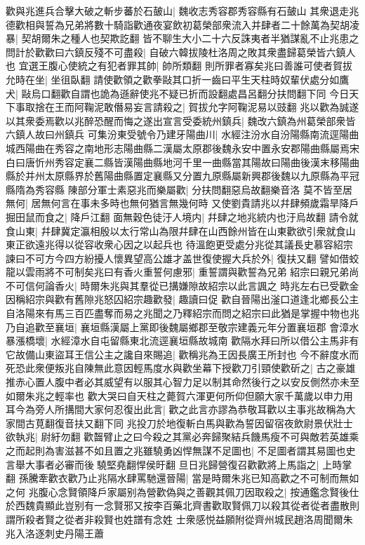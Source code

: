 歡與兆進兵合擊大破之斬步蕃於石皷山|{
	魏收志秀容郡秀容縣有石皷山}
其衆退走兆德歡相與誓為兄弟將數十騎詣歡通夜宴飲初葛榮部衆流入并肆者二十餘萬為契胡凌暴|{
	契胡爾朱之種人也契欺訖翻}
皆不聊生大小二十六反誅夷者半猶謀亂不止兆患之問計於歡歡曰六鎮反殘不可盡殺|{
	自破六韓拔陵杜洛周之敗其衆盡歸葛榮皆六鎮人也}
宜選王腹心使統之有犯者罪其帥|{
	帥所類翻}
則所罪者寡矣兆曰善誰可使者賀拔允時在坐|{
	坐徂臥翻}
請使歡領之歡拳敺其口折一齒曰平生天柱時奴輩伏處分如鷹犬|{
	敺烏口翻歡自謂也詭為遜辭使兆不疑已折而設翻處昌呂翻分扶問翻下同}
今日天下事取捨在王而阿鞠泥敢僭易妄言請殺之|{
	賀拔允字阿鞠泥易以豉翻}
兆以歡為誠遂以其衆委焉歡以兆醉恐醒而悔之遂出宣言受委統州鎮兵|{
	魏改六鎮為州葛榮部衆皆六鎮人故曰州鎮兵}
可集汾東受號令乃建牙陽曲川|{
	水經注汾水自汾陽縣南流逕陽曲城西陽曲在秀容之南地形志陽曲縣二漢屬太原郡後魏永安中置永安郡陽曲縣屬焉宋白曰唐忻州秀容定襄二縣皆漢陽曲縣地河千里一曲縣當其陽故曰陽曲後漢末移陽曲縣於并州太原縣界於舊陽曲縣置定襄縣又分置九原縣屬新興郡後魏以九原縣為平冠縣隋為秀容縣}
陳部分軍士素惡兆而樂屬歡|{
	分扶問翻惡烏故翻樂音洛}
莫不皆至居無何|{
	居無何言在事未多時也無何猶言無幾何時}
又使劉貴請兆以幷肆頻歲霜旱降戶掘田鼠而食之|{
	降戶江翻}
面無穀色徒汙人境内|{
	幷肆之地兆統内也汙烏故翻}
請令就食山東|{
	幷肆冀定瀛相殷以太行常山為限幷肆在山西餘州皆在山東歡欲引衆就食山東正欲遠兆得以從容收衆心因之以起兵也}
待溫飽更受處分兆從其議長史慕容紹宗諫曰不可方今四方紛擾人懷異望高公雄才盖世復使握大兵於外|{
	復扶又翻}
譬如借蛟龍以雲雨將不可制矣兆曰有香火重誓何慮邪|{
	重誓謂與歡誓為兄弟}
紹宗曰親兄弟尚不可信何論香火|{
	時爾朱兆與其羣從已搆嫌隙故紹宗以此言諷之}
時兆左右已受歡金因稱紹宗與歡有舊隙兆怒囚紹宗趣歡發|{
	趣讀曰促}
歡自晉陽出滏口道逢北鄉長公主自洛陽來有馬三百匹盡奪而易之兆聞之乃釋紹宗而問之紹宗曰此猶是掌握中物也兆乃自追歡至襄垣|{
	襄垣縣漢屬上黨即後魏屬鄉郡至敬宗建義元年分置襄垣郡}
會漳水暴漲橋壞|{
	水經漳水自屯留縣東北流逕襄垣縣故城南}
歡隔水拜曰所以借公主馬非有它故備山東盜耳王信公主之讒自來賜追|{
	歡稱兆為王因長廣王所封也}
今不辭度水而死恐此衆便叛兆自陳無此意因輕馬度水與歡坐幕下授歡刀引頸使歡斫之|{
	古之豪雄推赤心置人腹中者必其威望有以服其心智力足以制其命然後行之以安反側然亦未至如爾朱兆之輕率也}
歡大哭曰自天柱之薨賀六渾更何所仰但願大家千萬歲以申力用耳今為旁人所搆間大家何忍復出此言|{
	歡之此言亦謬為恭敬耳歡以主事兆故稱為大家間古莧翻復音扶又翻下同}
兆投刀於地復斬白馬與歡為誓因留宿夜飲尉景伏壯士欲執兆|{
	尉紆勿翻}
歡齧臂止之曰今殺之其黨必奔歸聚結兵饑馬瘦不可與敵若英雄乘之而起則為害滋甚不如且置之兆雖驍勇凶悍無謀不足圖也|{
	不足圖者謂其易圖也史言舉大事者必審而後驍堅堯翻悍侯旴翻}
旦日兆歸營復召歡歡將上馬詣之|{
	上時掌翻}
孫騰牽歡衣歡乃止兆隔水肆罵馳還晉陽|{
	當是時爾朱兆已知高歡之不可制而無如之何}
兆腹心念賢領降戶家屬别為營歡偽與之善觀其佩刀因取殺之|{
	按通鑑念賢後仕於西魏貴顯此豈别有一念賢邪又按李百藥北齊書歡取賢佩刀以殺其從者從者盡散則謂所殺者賢之從者非殺賢也姓譜有念姓}
士衆感悦益願附從齊州城民趙洛周聞爾朱兆入洛逐刺史丹陽王蕭

